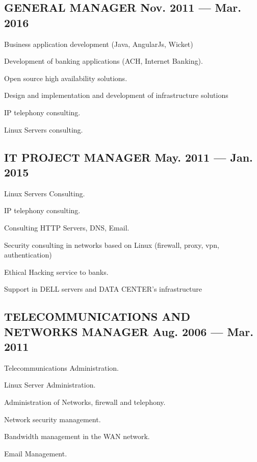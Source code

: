 \documentclass[letter,10pt]{article}
\begin{document}
\subsection{{GENERAL MANAGER \hfill Nov. 2011 --- Mar. 2016}}
\begin{zitemize}
\item	Business application development (Java, AngularJs, Wicket)
\item	Development of banking applications (ACH, Internet Banking).
\item	Open source high availability solutions.
\item	Design and implementation and development of infrastructure solutions
\item	IP telephony consulting.
\item	Linux Servers consulting.
\end{zitemize}
\vspace*{2mm}
\subsection{{IT PROJECT MANAGER \hfill May. 2011 --- Jan. 2015}}
\begin{zitemize}
\item	Linux Servers Consulting.
\item	IP telephony consulting.
\item	Consulting HTTP Servers, DNS, Email.
\item	Security consulting in networks based on Linux (firewall, proxy, vpn, authentication)
\item	Ethical Hacking service to banks.
\item	Support in DELL servers and DATA CENTER's infrastructure
\end{zitemize}
\vspace*{2mm}
\subsection{{TELECOMMUNICATIONS AND NETWORKS MANAGER \hfill Aug. 2006 --- Mar. 2011}}
\begin{zitemize}
\item	Telecommunications Administration.
\item	Linux Server Administration.
\item	Administration of Networks, firewall and telephony.
\item	Network security management.
\item	Bandwidth management in the WAN network.
\item	Email Management.	
\end{zitemize}
\vspace*{2mm}
\end{document}
